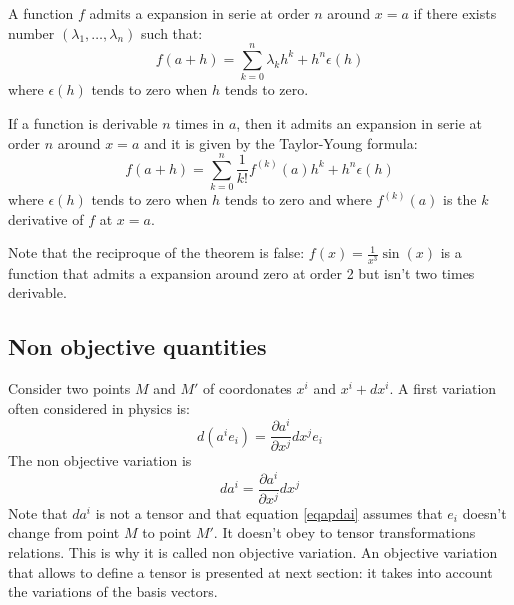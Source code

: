 \documentclass[12pt]{book}
\begin{document}
\begin{defn}
A function $f$ admits a expansion in serie at order $n$ around $x=a$
if there exists number $(\lambda_1,\dots,\lambda_n)$ such that:
\begin{equation}
f(a+h)=\sum_{k=0}^n \lambda_k h^k+h^n\epsilon(h)
\end{equation}
where $\epsilon(h)$ tends to zero when $h$ tends to zero.
\end{defn}

\begin{thm}
If a function is derivable $n$ times in $a$, then it admits an expansion in
serie at order $n$ around $x=a$ and it is given by the Taylor-Young
formula:
\begin{equation}
f(a+h)=\sum_{k=0}^n \frac{1}{k!}f^{(k)}(a) h^k+h^n\epsilon(h)
\end{equation}
where $\epsilon(h)$ tends to zero when $h$ tends to zero and where
$f^{(k)}(a)$ is the $k$ derivative of $f$ at $x=a$.


\end{thm}

Note that the reciproque of the theorem is false:
$f(x)=\frac{1}{x^3}\sin(x)$ is a function that admits a expansion
around zero at order 2 but isn't two times derivable.

\subsection{Non objective quantities}\label{secderico} 
Consider two points $M$ and $M'$ of coordonates $x^i$ and $x^i+dx^i$.
A first variation often considered in physics is:
\begin{equation}\label{eqapdai}
d(a^ie_i)=\frac{\partial a^i}{\partial x^j}dx^j e_i
\end{equation}
The non objective variation is
\begin{equation}
da^i=\frac{\partial a^i}{\partial x^j}dx^j 
\end{equation}
Note that $da^i$ is not a tensor and that equation \ref{eqapdai}
assumes that $e_i$ doesn't change from point $M$ to point $M'$. It
doesn't obey to tensor transformations 
relations. This is why it is called non objective variation. An objective
variation that allows to define a tensor is presented at next section: it
takes into account the variations of the basis vectors.
\end{document}

